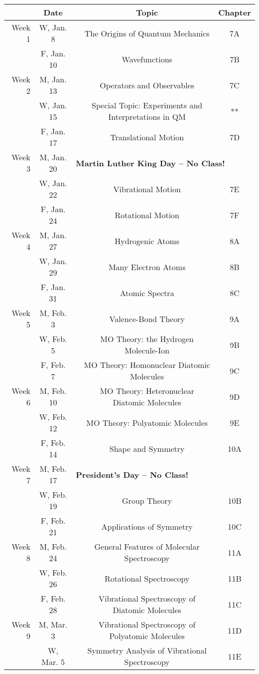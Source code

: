 \begin{tabular}{rcccc}
& Date && Topic & Chapter\\
\midrule
Week 1 & W, Jan. 8&& The Origins of Quantum Mechanics & 7A\\
& F, Jan. 10&& Wavefunctions & 7B\\
\midrule
Week 2 & M, Jan. 13&& Operators and Observables & 7C\\
& W, Jan. 15&& Special Topic: Experiments and Interpretations in QM & **\\
& F, Jan. 17&& Translational Motion & 7D\\
\midrule
Week 3 & M, Jan. 20& \multicolumn{3}{l}{\textbf{Martin Luther King Day -- No Class!}}\\
& W, Jan. 22&& Vibrational Motion & 7E\\
& F, Jan. 24&& Rotational Motion & 7F\\
\midrule
Week 4 & M, Jan. 27&& Hydrogenic Atoms & 8A\\
& W, Jan. 29&& Many Electron Atoms & 8B\\
& F, Jan. 31&& Atomic Spectra & 8C\\
\midrule
Week 5 & M, Feb. 3&& Valence-Bond Theory & 9A\\
& W, Feb. 5&& MO Theory: the Hydrogen Molecule-Ion & 9B\\
& F, Feb. 7&& MO Theory: Homonuclear Diatomic Molecules & 9C\\
\midrule
Week 6 & M, Feb. 10&& MO Theory: Heteronuclear Diatomic Molecules & 9D\\
& W, Feb. 12&& MO Theory: Polyatomic Molecules & 9E\\
& F, Feb. 14&& Shape and Symmetry & 10A\\
\midrule
Week 7 & M, Feb. 17& \multicolumn{3}{l}{\textbf{President's Day -- No Class!}}\\
& W, Feb. 19&& Group Theory & 10B\\
& F, Feb. 21&& Applications of Symmetry & 10C\\
\midrule
Week 8 & M, Feb. 24&& General Features of Molecular Spectroscopy & 11A\\
& W, Feb. 26&& Rotational Spectroscopy & 11B\\
& F, Feb. 28&& Vibrational Spectroscopy of Diatomic Molecules & 11C\\
\midrule
Week 9 & M, Mar. 3&& Vibrational Spectroscopy of Polyatomic Molecules & 11D\\
& W, Mar. 5&& Symmetry Analysis of Vibrational Spectroscopy & 11E\\

\end{tabular}
